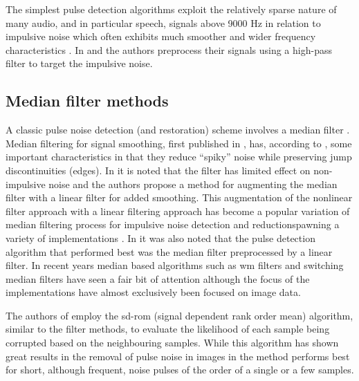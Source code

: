The simplest pulse detection algorithms exploit the relatively sparse nature of many audio, and in particular speech, signals above 9000 Hz in relation to impulsive noise which often exhibits \DIFdelbegin {}\DIFdelend much smoother and wider frequency characteristics \cite{Subramanya2007}. In \cite{Kasparis1993} and \cite{US6795559} the authors preprocess their signals using a high-pass filter to target the impulsive noise.

\subsection{Median filter methods}\label{sec:LitRevDetMedianFilts}
A classic pulse noise detection (and restoration) scheme involves a median filter \cite{Tukey1974}\linebreak[2]\cite{Lee1985}\cite{Heinonen1985}\cite{Heinonen1987}\cite{Maekivirta1991}\cite{Kasparis1993}.
Median filtering for signal smoothing, first published in \cite{Tukey1974}, has, according to \cite{Brillinger2002}, some important characteristics in that they reduce ``spiky'' noise while preserving jump discontinuities (edges). In \cite{Lee1985} it is noted that the \DIFdelbegin {}\DIFdelend \DIFaddbegin {}\DIFaddend filter has limited effect on non-impulsive noise and the authors propose a method for augmenting the median filter with a linear filter for added smoothing. This augmentation of the nonlinear \DIFdelbegin {}\DIFdelend \DIFaddbegin {}\DIFaddend filter approach with a linear filtering approach has become a popular variation of \DIFaddbegin {}\DIFaddend median filtering process for impulsive noise detection and reduction\DIFaddbegin \DIFadd{, }\DIFaddend spawning a variety of implementations \cite{Lee1985}\cite{Heinonen1985}\cite{Nieminen1987}\cite{Kasparis1993}\cite{Loveridge1995}. In \cite{Kauppinen2002} it was also noted that the pulse detection algorithm that performed best was the median filter preprocessed by a linear filter. In recent years median based algorithms such as \DIFdelbegin {}\DIFdelend \DIFaddbegin \gls{wm} \DIFaddend filters \cite{Yin1996}\cite{Wang2010} and switching median filters \cite{Abreu1996}\cite{Chen2000}\cite{Chen2001}\cite{Lin2007} have seen a fair bit of attention although the focus of the implementations have almost exclusively been focused on image data.

The authors of \cite{Chandra1998} employ the \DIFdelbegin {}\DIFdelend \DIFaddbegin \gls{sd-rom} \DIFaddend (signal dependent rank order mean) algorithm, similar to the \DIFdelbegin {}\DIFdelend \DIFaddbegin {}\DIFaddend filter methods, to evaluate the likelihood of each sample being corrupted based on the neighbouring samples. While this algorithm has shown great results in the removal of pulse noise in images \cite{Abreu1996}\DIFaddbegin \DIFadd{, }\DIFaddend in \cite{Chandra1998} the method performs best for short, although frequent, noise pulses of the order of a single or a few samples.


